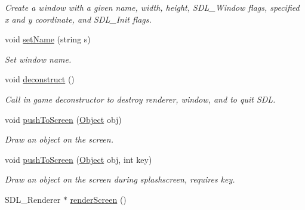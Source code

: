 \begin{DoxyCompactItemize}
\begin{DoxyCompactList}\small\item\em Create a window with a given name, width, height, S\+D\+L\+\_\+\+Window flags, specified x and y coordinate, and S\+D\+L\+\_\+\+Init flags. \end{DoxyCompactList}\item 
void \hyperlink{classEngine_ae59bcd31693811574953ba835ecb09bb}{set\+Name} (string s)\hypertarget{classEngine_ae59bcd31693811574953ba835ecb09bb}{}\label{classEngine_ae59bcd31693811574953ba835ecb09bb}

\begin{DoxyCompactList}\small\item\em Set window name. \end{DoxyCompactList}\item 
void \hyperlink{classEngine_a9c0b65f41a2991857265f7be0a177e13}{deconstruct} ()\hypertarget{classEngine_a9c0b65f41a2991857265f7be0a177e13}{}\label{classEngine_a9c0b65f41a2991857265f7be0a177e13}

\begin{DoxyCompactList}\small\item\em Call in game deconstructor to destroy renderer, window, and to quit S\+DL. \end{DoxyCompactList}\item 
void \hyperlink{classEngine_a6adc1b843b8874274c0db6f95e705ef5}{push\+To\+Screen} (\hyperlink{classObject}{Object} obj)\hypertarget{classEngine_a6adc1b843b8874274c0db6f95e705ef5}{}\label{classEngine_a6adc1b843b8874274c0db6f95e705ef5}

\begin{DoxyCompactList}\small\item\em Draw an object on the screen. \end{DoxyCompactList}\item 
void \hyperlink{classEngine_a42800416f18b300577e3c0685103afe2}{push\+To\+Screen} (\hyperlink{classObject}{Object} obj, int key)\hypertarget{classEngine_a42800416f18b300577e3c0685103afe2}{}\label{classEngine_a42800416f18b300577e3c0685103afe2}

\begin{DoxyCompactList}\small\item\em Draw an object on the screen during splashscreen, requires key. \end{DoxyCompactList}\item 
S\+D\+L\+\_\+\+Renderer $\ast$ \hyperlink{classEngine_a0ace821c5c3f1b2015ff51a0c9bae1e7}{render\+Screen} ()\hypertarget{classEngine_a0ace821c5c3f1b2015ff51a0c9bae1e7}{}\label{classEngine_a0ace821c5c3f1b2015ff51a0c9bae1e7}


\end{DoxyCompactItemize}
